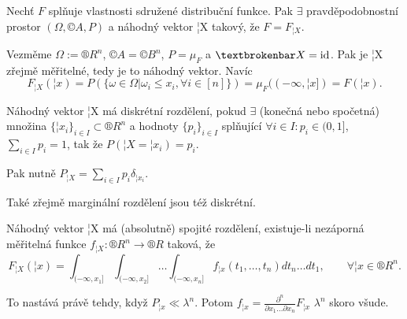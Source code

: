 \documentclass[12pt]{article}					%
\begin{document}
\begin{veta}
	Nechť $F$ splňuje vlastnosti sdružené distribuční funkce. Pak $\exists$ pravděpodobnostní prostor $(\Omega, ©A, P)$ a náhodný vektor ¦X takový, že $F = F_{¦X}$.

	\begin{dukazin}
		Vezměme $\Omega := ®R^n$, $©A = ©B^n$, $P = \mu_F$ a $¦X = \id$. Pak je ¦X zřejmě měřitelné, tedy je to náhodný vektor. Navíc
		$$ F_{¦X}(¦x) = P(\{\omega \in \Omega | \omega_i ≤ x_i, \forall i \in [n]\}) = \mu_F((-∞, ¦x]) = F(¦x). $$
	\end{dukazin}
\end{veta}

\begin{definice}
	Náhodný vektor ¦X má diskrétní rozdělení, pokud $\exists$ (konečná nebo spočetná) množina $\{¦x_i\}_{i \in I} \subset ®R^n$ a hodnoty $\{p_i\}_{i \in I}$ splňující $\forall i \in I: p_i \in (0, 1]$, $\sum_{i \in I} p_i = 1$, tak že $P(¦X = ¦x_i) = p_i$.

	\begin{poznamkain}
		Pak nutně $P_{¦X} = \sum_{i \in I} p_i \delta_{¦x_i}$.

		Také zřejmě marginální rozdělení jsou též diskrétní.
	\end{poznamkain}
\end{definice}

\begin{definice}
	Náhodný vektor ¦X má (absolutně) spojité rozdělení, existuje-li nezáporná měřitelná funkce $f_{¦X}: ®R^n \rightarrow ®R$ taková, že
	$$ F_{¦X}(¦x) = \int_{(-∞, x_1]} \int_{(-∞, x_2]} … \int_{(-∞, x_n]} f_{¦x}(t_1, …, t_n) dt_n … dt_1, \qquad \forall ¦x \in ®R^n. $$

	\begin{poznamka}
		To nastává právě tehdy, když $P_{¦x} \ll \lambda^n$. Potom $f_{¦x} = \frac{\partial^n}{\partial x_1 … \partial x_n} F_{¦x}$ $\lambda^n$ skoro všude.
	\end{poznamka}
\end{definice}
\end{document}
